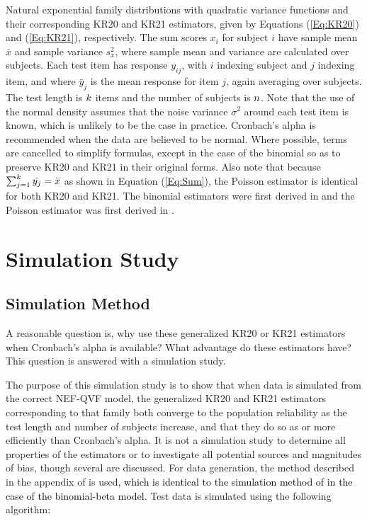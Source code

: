 \documentclass[12pt,epsfig]{article}
\newcommand{\changed}[1]{\textcolor{black}{#1}}
\newcommand{\numsubjects}{\changed{n}}%
\newcommand{\testlength}{\changed{k}}%
\begin{document}
\begin{table}[h]
\caption{Natural exponential family distributions with quadratic variance functions and their corresponding KR20 and KR21 estimators, given by Equations (\ref{Eq:KR20}) and (\ref{Eq:KR21}), respectively. The sum scores $x_i$ for subject $i$ have sample mean $\bar{x}$ and sample variance $s^2_x$, where sample mean and variance are calculated over subjects. Each test item has response $y_{ij}$, with $i$ indexing subject and $j$ indexing item, and where $\bar{y}_j$ is the mean response for item $j$, again averaging over subjects. The test length is $\testlength$ items and the number of subjects is $\numsubjects$. Note that the use of the normal density assumes that the noise variance $\sigma^2$ around each test item is known, which is unlikely to be the case in practice. Cronbach's alpha is recommended when the data are believed to be normal. Where possible, terms are cancelled to simplify formulas, except in the case of the binomial so as to preserve KR20 and KR21 in their original forms. Also note that because $ \sum_{j = 1}^{\testlength} \bar{y_j} = \bar{x}$ as shown in Equation (\ref{Eq:Sum}), the Poisson estimator is identical for both KR20 and KR21. The binomial estimators were first derived in \cite{Kuder1937} and the Poisson estimator was first derived in \cite{Allison1978}. }
\label{Tab:Estimators}
\end{table}





\section{Simulation Study}
\label{Sec:Simulations}

\subsection{Simulation Method}
\label{Subsec:SimulationMethod}

A reasonable question is, why use these generalized KR20 or KR21 estimators when Cronbach's alpha is available?  What advantage do these estimators have? This question is answered with a simulation study.  

The purpose of this simulation study is to show that when data is simulated from the correct NEF-QVF model, the generalized KR20 and KR21 estimators corresponding to that family  both converge to the population reliability as the test length and number of subjects increase, and that they do so as or more efficiently than Cronbach's alpha. It is not a simulation study to determine all properties of the estimators or to investigate all potential sources and magnitudes of bias, though several are discussed.  For data generation, the method described in the appendix of \cite{Foster2020} is used\changed{, which is identical to the simulation method of \cite{Huynh1979} in the case of the binomial-beta model}. Test data is simulated using the following algorithm:
\end{document}
